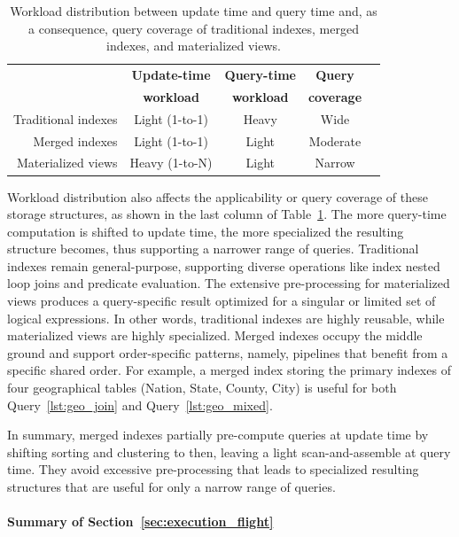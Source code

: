 \documentclass[sigconf, pdfa, nonacm]{acmart}
\newcommand\summary[1]{\paragraph{\textbf{#1}}}
\begin{document}
\begin{table}[htbp]
    \centering
    \small
    \caption{Workload distribution between update time and query time and, as a consequence, query coverage of traditional indexes, merged indexes, and materialized views.
    }\label{tab:update-time-vs-query-time}
    \begin{tabular}{r c c c c}
        \toprule
        & \textbf{Update-time} & \textbf{Query-time} & \textbf{Query}\\
        & \textbf{workload} & \textbf{workload} & \textbf{coverage}\\
        \midrule
        Traditional indexes & Light (1-to-1) & Heavy & Wide\\
        Merged indexes & Light (1-to-1) & Light & Moderate \\
        Materialized views & Heavy (1-to-N) & Light & Narrow\\
        \bottomrule
    \end{tabular}
\end{table}

Workload distribution also affects the applicability or query coverage of these storage structures, as shown in the last column of Table~\ref{tab:update-time-vs-query-time}.
The more query-time computation is shifted to update time, the more specialized the resulting structure becomes, thus supporting a narrower range of queries.
Traditional indexes remain general-purpose, supporting diverse operations like index nested loop joins and predicate evaluation. 
The extensive pre-processing for materialized views produces a query-specific result optimized for a singular or limited set of logical expressions. 
In other words, traditional indexes are highly reusable, while materialized views are highly specialized.
Merged indexes occupy the middle ground and support order-specific patterns, namely, pipelines that benefit from a specific shared order.
For example, a merged index storing the primary indexes of four geographical tables (Nation, State, County, City) is useful for both Query~\ref{lst:geo_join} and Query~\ref{lst:geo_mixed}.

In summary, merged indexes partially pre-compute queries at update time by shifting sorting and clustering to then, leaving a light scan-and-assemble at query time. They avoid excessive pre-processing that leads to specialized resulting structures that are useful for only a narrow range of queries.

\summary{Summary of Section~\ref{sec:execution_flight}}
\end{document}
